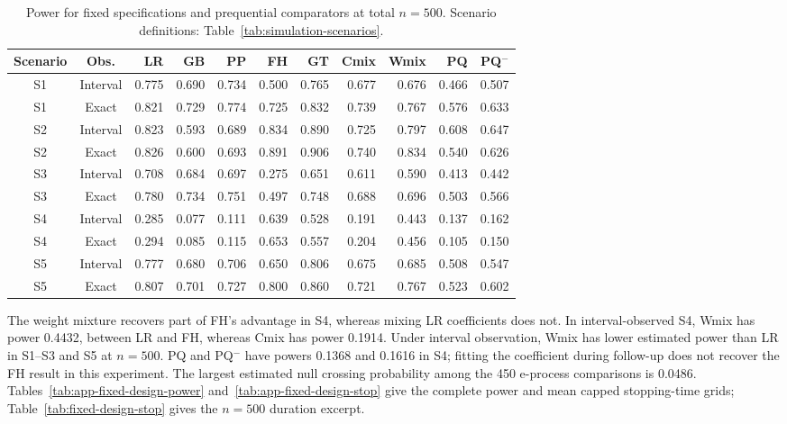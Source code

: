 \documentclass[12pt]{article}
\theoremstyle{definition}
\theoremstyle{remark}
\begin{document}
\begin{table}[H]
\centering
\scriptsize
\setlength{\tabcolsep}{3pt}
\renewcommand{\arraystretch}{1.10}
\caption{Power for fixed specifications and prequential comparators at total $n=500$. Scenario definitions: Table~\ref{tab:simulation-scenarios}.}\label{tab:fixed-design-power}
\begin{tabular}{ccrrrrrrrrr}
\toprule
Scenario & Obs. & LR & GB & PP & FH & GT & Cmix & Wmix & PQ & PQ$^{-}$ \\
\midrule
S1 & Interval & 0.775 & 0.690 & 0.734 & 0.500 & 0.765 & 0.677 & 0.676 & 0.466 & 0.507 \\
S1 & Exact & 0.821 & 0.729 & 0.774 & 0.725 & 0.832 & 0.739 & 0.767 & 0.576 & 0.633 \\
S2 & Interval & 0.823 & 0.593 & 0.689 & 0.834 & 0.890 & 0.725 & 0.797 & 0.608 & 0.647 \\
S2 & Exact & 0.826 & 0.600 & 0.693 & 0.891 & 0.906 & 0.740 & 0.834 & 0.540 & 0.626 \\
S3 & Interval & 0.708 & 0.684 & 0.697 & 0.275 & 0.651 & 0.611 & 0.590 & 0.413 & 0.442 \\
S3 & Exact & 0.780 & 0.734 & 0.751 & 0.497 & 0.748 & 0.688 & 0.696 & 0.503 & 0.566 \\
S4 & Interval & 0.285 & 0.077 & 0.111 & 0.639 & 0.528 & 0.191 & 0.443 & 0.137 & 0.162 \\
S4 & Exact & 0.294 & 0.085 & 0.115 & 0.653 & 0.557 & 0.204 & 0.456 & 0.105 & 0.150 \\
S5 & Interval & 0.777 & 0.680 & 0.706 & 0.650 & 0.806 & 0.675 & 0.685 & 0.508 & 0.547 \\
S5 & Exact & 0.807 & 0.701 & 0.727 & 0.800 & 0.860 & 0.721 & 0.767 & 0.523 & 0.602 \\
\bottomrule
\end{tabular}
\end{table}

The weight mixture recovers part of FH's advantage in S4, whereas mixing LR coefficients does not. In interval-observed S4, Wmix has power 0.4432, between LR and FH, whereas Cmix has power 0.1914. Under interval observation, Wmix has lower estimated power than LR in S1--S3 and S5 at $n=500$. PQ and PQ$^-$ have powers 0.1368 and 0.1616 in S4; fitting the coefficient during follow-up does not recover the FH result in this experiment. The largest estimated null crossing probability among the 450 e-process comparisons is 0.0486. Tables~\ref{tab:app-fixed-design-power} and~\ref{tab:app-fixed-design-stop} give the complete power and mean capped stopping-time grids; Table~\ref{tab:fixed-design-stop} gives the $n=500$ duration excerpt.
\end{document}
